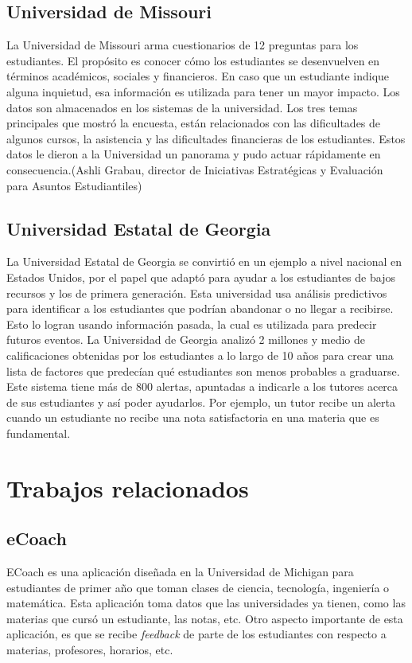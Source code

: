 \subsection[Universidad de Missouri]{Universidad de Missouri}
La Universidad de Missouri arma cuestionarios de 12 preguntas para los estudiantes. El propósito es conocer cómo los estudiantes se desenvuelven en términos académicos, sociales y financieros. En caso que un estudiante indique alguna inquietud, esa información es utilizada para tener un mayor impacto. Los datos son almacenados en los sistemas de la universidad.
Los tres temas principales que mostró la encuesta, están relacionados con las dificultades de algunos cursos, la asistencia y las dificultades financieras de los estudiantes. Estos datos le dieron a la Universidad un panorama y pudo actuar rápidamente en consecuencia.(Ashli Grabau, director de Iniciativas Estratégicas y Evaluación para Asuntos Estudiantiles)

\subsection[Universidad Estatal de Georgia]{Universidad Estatal de Georgia}

La Universidad Estatal de Georgia se convirtió en un ejemplo a nivel nacional en Estados Unidos, por el papel que adaptó para ayudar a los estudiantes de bajos recursos y los de primera generación. 
Esta universidad usa análisis predictivos para identificar a los estudiantes que podrían abandonar o no llegar a recibirse. Esto lo logran usando información pasada, la cual es utilizada para predecir futuros eventos. 
La Universidad de Georgia analizó 2 millones y medio de calificaciones obtenidas por los estudiantes a lo largo de 10 años para crear una lista de factores que predecían qué estudiantes son menos probables a graduarse. Este sistema tiene más de 800 alertas, apuntadas a indicarle a los tutores acerca de sus estudiantes y así poder ayudarlos. Por ejemplo, un tutor recibe un alerta cuando un estudiante no recibe una nota satisfactoria en una materia que es fundamental. 





\section[Trabajos relacionados]{Trabajos relacionados}

\subsection[eCoach]{eCoach}
ECoach es una aplicación diseñada en la Universidad de Michigan para estudiantes de primer año que toman clases de ciencia, tecnología, ingeniería o matemática. Esta aplicación toma datos que las universidades ya tienen, como las materias que cursó un estudiante, las notas, etc.
Otro aspecto importante de esta aplicación, es que se recibe \textit{feedback} de parte de los estudiantes con respecto a materias, profesores, horarios, etc.

